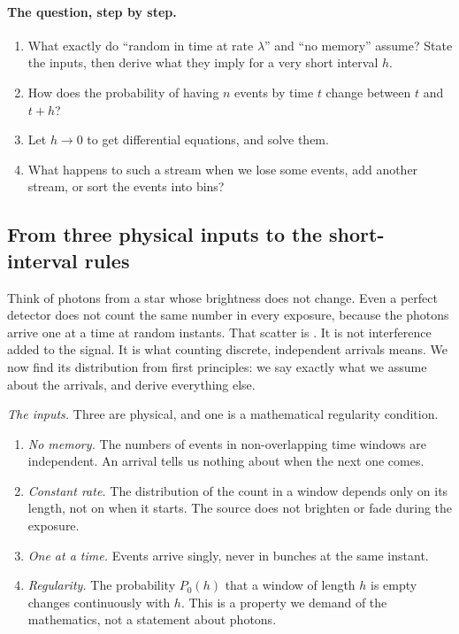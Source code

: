 \paragraph{The question, step by step.}
\begin{enumerate}[leftmargin=1.6em,itemsep=1pt]
  \item What exactly do ``random in time at rate $\lambda$'' and ``no memory'' assume? State the inputs, then derive what they imply for a very short interval $h$.
  \item How does the probability of having $n$ events by time $t$ change between $t$ and $t+h$?
  \item Let $h\to0$ to get differential equations, and solve them.
  \item What happens to such a stream when we lose some events, add another stream, or sort the events into bins?
\end{enumerate}

\subsection{From three physical inputs to the short-interval rules}
\label{2a:sec:poisson-inputs}

Think of photons from a star whose brightness does not change. Even a perfect
detector does not count the same number in every exposure, because the photons
arrive one at a time at random instants. That scatter is .
It is not interference added to the signal. It is what counting discrete,
independent arrivals means. We now find its distribution from first principles:
we say exactly what we assume about the arrivals, and derive everything else.

\emph{The inputs.} Three are physical, and one is a mathematical regularity
condition.
\begin{enumerate}[label=(P\arabic*),leftmargin=2.6em,itemsep=1pt]
  \item \emph{No memory.} The numbers of events in non-overlapping time windows
        are independent. An arrival tells us nothing about when the next one comes.
  \item \emph{Constant rate.} The distribution of the count in a window depends
        only on its length, not on when it starts. The source does not brighten
        or fade during the exposure.
  \item \emph{One at a time.} Events arrive singly, never in bunches at the same
        instant.
  \item[(R)] \emph{Regularity.} The probability $P_0(h)$ that a window of length
        $h$ is empty changes continuously with $h$. This is a property we demand of
        the mathematics, not a statement about photons.
\end{enumerate}

